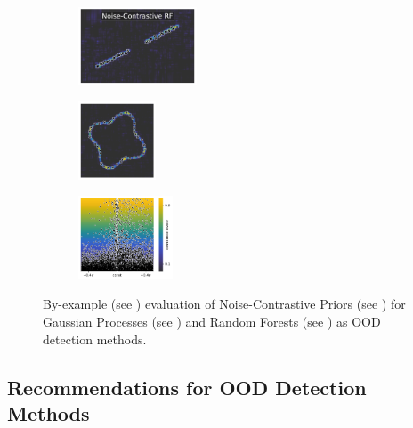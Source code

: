 \begin{figure}[H]
    \begin{subfigure}
        \centering
        \includegraphics[width=0.388\textwidth,valign=t]{ood-detection/figures/ood-detection/confidence-line-nc-rf.pdf}
    \end{subfigure}
    \begin{subfigure}
        \centering
        \includegraphics[width=0.254\textwidth,valign=t]{ood-detection/figures/ood-detection/confidence-circle-nc-rf.pdf}
    \end{subfigure}
    \begin{subfigure}
        \centering
        \includegraphics[width=0.308\textwidth,valign=t]{ood-detection/figures/ood-detection/confidence-haystack-nc-rf.pdf}
    \end{subfigure}

    \caption[Noise-Contrastive Priors for OOD detection]{By-example (see ) evaluation of Noise-Contrastive Priors (see ) for Gaussian Processes (see ) and Random Forests (see ) as OOD detection methods.}
    \label{fig:ncp-gp-rf-ood-detection}
\end{figure}

\subsection{Recommendations for OOD Detection Methods} \label{txt:ood-detection-summary}


